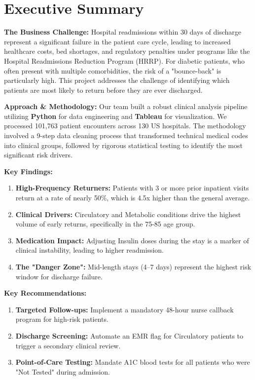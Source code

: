 \documentclass[12pt,a4paper]{article}
\begin{document}
\newpage
\tableofcontents
\newpage

\section{Executive Summary}
\textbf{The Business Challenge:} 
Hospital readmissions within 30 days of discharge represent a significant failure in the patient care cycle, leading to increased healthcare costs, bed shortages, and regulatory penalties under programs like the Hospital Readmissions Reduction Program (HRRP). For diabetic patients, who often present with multiple comorbidities, the risk of a "bounce-back" is particularly high. This project addresses the challenge of identifying which patients are most likely to return before they are ever discharged.

\textbf{Approach \& Methodology:} 
Our team built a robust clinical analysis pipeline utilizing \textbf{Python} for data engineering and \textbf{Tableau} for visualization. We processed 101,763 patient encounters across 130 US hospitals. The methodology involved a 9-step data cleaning process that transformed technical medical codes into clinical groups, followed by rigorous statistical testing to identify the most significant risk drivers.

\textbf{Key Findings:}
\begin{enumerate}
    \item \textbf{High-Frequency Returners:} Patients with 3 or more prior inpatient visits return at a rate of nearly 50\%, which is 4.5x higher than the general average.
    \item \textbf{Clinical Drivers:} Circulatory and Metabolic conditions drive the highest volume of early returns, specifically in the 75-85 age group.
    \item \textbf{Medication Impact:} Adjusting Insulin doses during the stay is a marker of clinical instability, leading to higher readmission.
    \item \textbf{The "Danger Zone":} Mid-length stays (4–7 days) represent the highest risk window for discharge failure.
\end{enumerate}

\textbf{Key Recommendations:}
\begin{enumerate}
    \item \textbf{Targeted Follow-ups:} Implement a mandatory 48-hour nurse callback program for high-risk patients.
    \item \textbf{Discharge Screening:} Automate an EMR flag for Circulatory patients to trigger a secondary clinical review.
    \item \textbf{Point-of-Care Testing:} Mandate A1C blood tests for all patients who were "Not Tested" during admission.
\end{enumerate}
\end{document}
